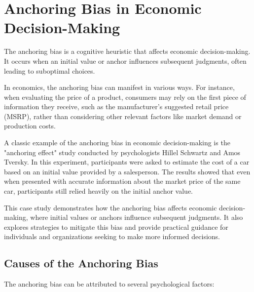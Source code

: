 \chapter{Anchoring Bias in Economic Decision-Making}

The anchoring bias is a cognitive heuristic that affects economic decision-making. It occurs when an initial value or anchor influences subsequent judgments, often leading to suboptimal choices.

In economics, the anchoring bias can manifest in various ways. For instance, when evaluating the price of a product, consumers may rely on the first piece of information they receive, such as the manufacturer's suggested retail price (MSRP), rather than considering other relevant factors like market demand or production costs.

A classic example of the anchoring bias in economic decision-making is the "anchoring effect" study conducted by psychologists Hillel Schwartz and Amos Tversky. In this experiment, participants were asked to estimate the cost of a car based on an initial value provided by a salesperson. The results showed that even when presented with accurate information about the market price of the same car, participants still relied heavily on the initial anchor value.

This case study demonstrates how the anchoring bias affects economic decision-making, where initial values or anchors influence subsequent judgments. It also explores strategies to mitigate this bias and provide practical guidance for individuals and organizations seeking to make more informed decisions.

\section{Causes of the Anchoring Bias}

The anchoring bias can be attributed to several psychological factors:

